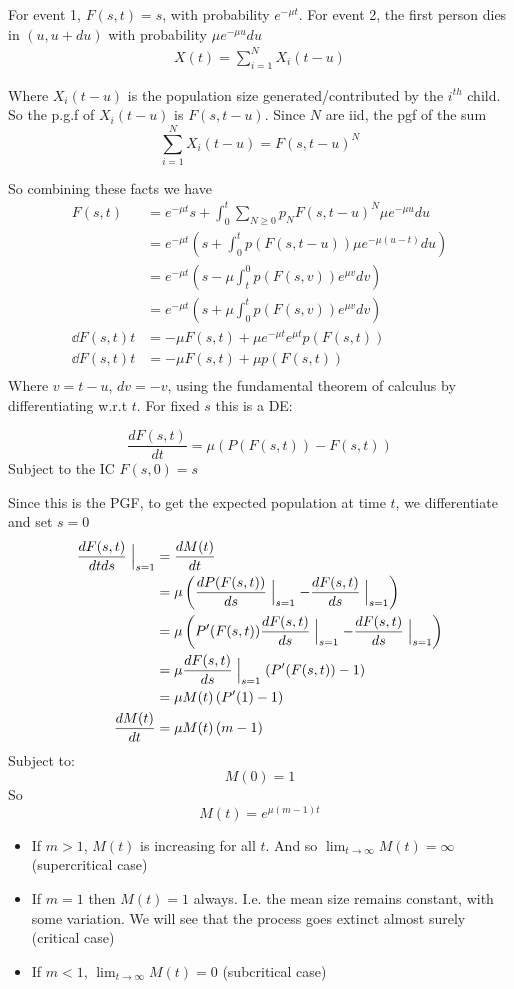 \documentclass{/home/janmebows/Documents/LatexTemplates/myassignment}
\begin{document}
For event 1, $F(s,t) = s$, with probability $e^{-\mu t}$.
For event 2, the first person dies in $(u,u+du)$ with probability $\mu e^{-\mu u} du$
\begin{align*}
    X(t) = \sum_{i=1}^N X_i(t-u)
\end{align*}

Where $X_i(t-u)$ is the population size generated/contributed by the $i^{th}$ child. So the p.g.f of $X_i(t-u)$ is $F(s,t-u)$. Since $N$ are iid, the pgf of the sum 
\[\sum_{i=1}^N X_i(t-u) = F(s,t-u)^N\]

So combining these facts we have
\begin{align*}
    F(s,t) &= e^{-\mu t} s + \int_0^t \sum_{N\geq 0} p_N F(s,t-u)^N \mu e^{-\mu u} du\\
    &= e^{-\mu t}\left( s + \int_0^t p(F(s,t-u)) \mu e^{-\mu (u-t)} du\right)\\
    &= e^{-\mu t}\left( s - \mu\int_t^0 p(F(s,v)) e^{\mu v} dv\right)\\
    &= e^{-\mu t}\left( s + \mu\int_0^t p(F(s,v)) e^{\mu v} dv\right)\\
    \dd{F(s,t)}{t} &= -\mu F(s,t) + \mu e^{-\mu t} e^{\mu t} p(F(s,t))\\
    \dd{F(s,t)}{t} &= -\mu F(s,t) + \mu p(F(s,t))\\
\end{align*}
Where $v=t-u$, $dv = -v$, using the fundamental theorem of calculus by differentiating w.r.t $t$. For fixed $s$ this is a DE:

\[\frac{dF(s,t)}{dt} = \mu(P(F(s,t)) - F(s,t))\]
Subject to the IC $F(s,0) = s$

Since this is the PGF, to get the expected population at time $t$, we differentiate and set $s=0$
\begin{align*}
    \frac{dF(s,t)}{dtds}\Bigm|_{s=1} &= \frac{dM(t)}{dt}\\
    &= \mu \left(\frac{dP(F(s,t))}{ds}\Bigm|_{s=1} - \frac{dF(s,t)}{ds}\Bigm|_{s=1}\right)\\
    &= \mu \left(P'(F(s,t)) \frac{dF(s,t)}{ds}\Bigm|_{s=1} - \frac{dF(s,t)}{ds}\Bigm|_{s=1}\right)\\
    &= \mu \frac{dF(s,t)}{ds}\Bigm|_{s=1}\left(P'(F(s,t)) - 1\right)\\
    &= \mu M(t)\left(P'(1) - 1\right)\\
    \frac{dM(t)}{dt}&= \mu M(t)\left(m - 1\right)\\
\end{align*}
Subject to:
\[M(0) = 1\]
So 
\[M(t) = e^{\mu(m-1)t}\]
\begin{itemize}
    \item If $m > 1$, $M(t)$ is increasing for all $t$. And so $\lim_{t\to\infty} M(t) = \infty$ (supercritical case)
    \item If $m =1$ then $M(t) = 1$ always. I.e. the mean size remains constant, with some variation. We will see that the process goes extinct almost surely (critical case)
    \item If $m < 1$, $\lim_{t\to\infty} M(t) = 0$ (subcritical case)
\end{itemize}
\end{document}
